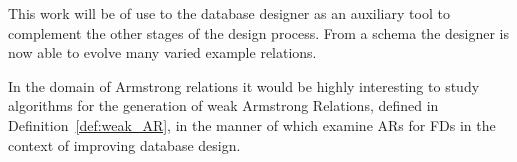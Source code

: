 \medskip

This work
will be of use to the database designer as an auxiliary tool to complement
the other stages of the design process.  From a schema the designer is now
 able to evolve many varied example relations.

\medskip

In the domain of Armstrong relations it would be highly interesting to
study algorithms for the generation of weak Armstrong Relations,
defined in Definition~\ref{def:weak_AR}, in the manner of
\cite{fag82,bdfs84} which examine ARs for FDs in the context of
improving database design.




